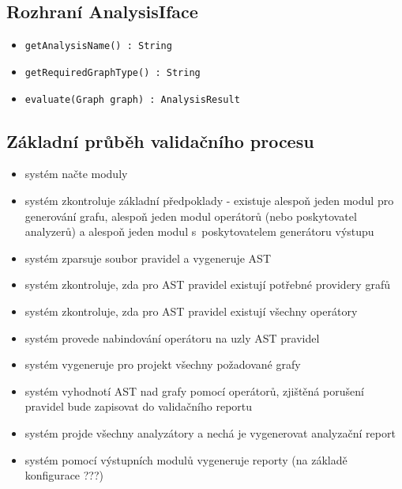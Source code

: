 \subsection{Rozhraní AnalysisIface}
\begin{itemize}
\item \verb-getAnalysisName() : String-
\item \verb-getRequiredGraphType() : String-
\item \verb-evaluate(Graph graph) : AnalysisResult-
\end{itemize}

\subsection{Základní průběh validačního procesu}


\begin{itemize}
\item systém načte moduly
\item systém zkontroluje základní předpoklady - existuje alespoň jeden modul pro generování grafu, alespoň jeden modul operátorů (nebo poskytovatel analyzerů) a alespoň jeden modul s~poskytovatelem generátoru výstupu
\item systém zparsuje soubor pravidel a vygeneruje AST
\item systém zkontroluje, zda pro AST pravidel existují potřebné providery grafů
\item systém zkontroluje, zda pro AST pravidel existují všechny operátory
\item systém provede nabindování operátoru na uzly AST pravidel
\item systém vygeneruje pro projekt všechny požadované grafy
\item systém vyhodnotí AST nad grafy pomocí operátorů, zjištěná porušení pravidel bude zapisovat do validačního reportu
\item systém projde všechny analyzátory a nechá je vygenerovat analyzační report
\item systém pomocí výstupních modulů vygeneruje reporty (na základě konfigurace ???)
\end{itemize}


